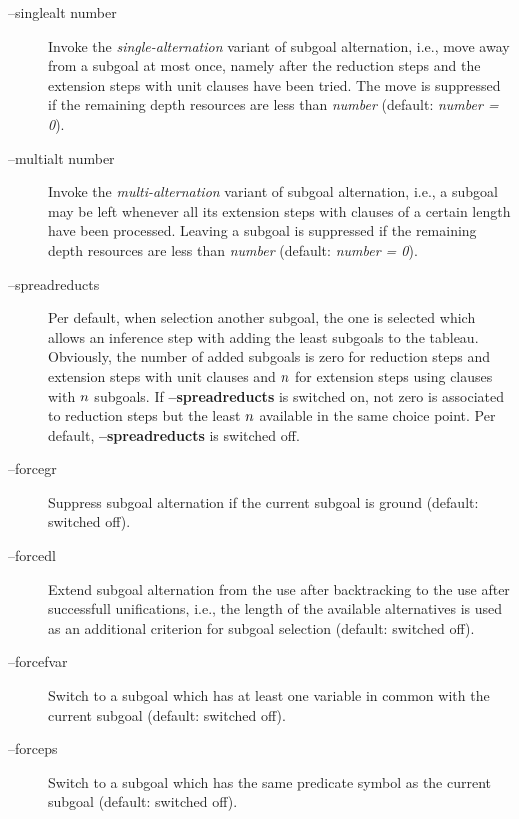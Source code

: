 \begin{description}
      \item [--singlealt \lb number\rb]
            Invoke the {\em single-alternation\/} variant of subgoal
            alternation, i.e., move away from a subgoal at most once,
            namely after the reduction steps and the extension steps
            with unit clauses have been tried.
            The move is suppressed if the remaining depth resources
            are less than {\it number\/} (default: {\it number = 0}).
      \item [--multialt \lb number\rb]
            Invoke the {\em multi-alternation\/} variant of subgoal
            alternation, i.e., a subgoal may be left whenever all its
            extension steps with clauses of a certain length have been
            processed. 
            Leaving a subgoal is suppressed if the remaining depth
            resources are less than {\it number\/} (default: {\it
            number = 0}). 
      \item [--spreadreducts] 
            Per default, when selection another subgoal, the one is
            selected which allows an inference step with adding the
            least subgoals to the tableau.
            Obviously, the number of added subgoals is zero for
            reduction steps and extension steps with unit clauses and
            $n\/$ for extension steps using clauses with $n\/$
            subgoals. 
            If {\bf --spreadreducts} is switched on, not zero is
            associated to reduction steps but the least $n\/$
            available in the same choice point.
            Per default, {\bf --spreadreducts} is switched off.
      \item [--forcegr]
            Suppress subgoal alternation if the current subgoal is
            ground (default: switched off). 
      \item [--forcedl]
            Extend subgoal alternation from the use after backtracking
            to the use after successfull unifications, i.e., the
            length of the available alternatives is used as an
            additional criterion for subgoal selection (default:
            switched off). 
      \item [--forcefvar]
            Switch to a subgoal which has at least one variable in
            common with the current subgoal (default: switched off). 
      \item [--forceps]
            Switch to a subgoal which has the same predicate symbol as
            the current subgoal (default: switched off).
\end{description}

